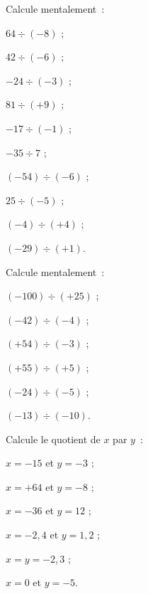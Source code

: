 \begin{exercice}
Calcule mentalement :
\begin{colenumerate}{2}
 \item $64 \div (- 8)$ ;
 \item $42 \div (- 6)$ ;
 \item $- 24 \div (- 3)$ ;
 \item $81 \div (+ 9)$ ;
 \item $- 17 \div (- 1)$ ;
 \item $- 35 \div 7$ ;
 \item $(- 54) \div (- 6)$ ;
 \item $25 \div (- 5)$ ;
 \item $(- 4) \div (+ 4)$ ;
 \item $(- 29) \div (+ 1)$.
 \end{colenumerate}
\end{exercice}


\begin{exercice}
Calcule mentalement :
\begin{colenumerate}{2}
 \item $(- 100) \div (+ 25)$ ;
 \item $(- 42) \div (- 4)$ ;
 \item $(+ 54) \div (- 3)$ ;
 \item $(+ 55) \div (+ 5)$ ;
 \item $(- 24) \div (- 5)$ ;
 \item $(- 13)  \div (- 10)$.
 \end{colenumerate}
\end{exercice}


\begin{exercice}
Calcule le quotient de $x$ par $y$ :
\begin{colenumerate}{2}
 \item $x = - 15$ et $y = - 3$ ;
 \item $x = + 64$ et $y = - 8$ ;
 \item $x = - 36$ et $y = 12$ ;
 \item $x = - 2,4$ et $y = 1,2$ ;
 \item $x = y = - 2,3$ ;
 \item $x = 0$ et $y = - 5$.
 \end{colenumerate}
\end{exercice}


